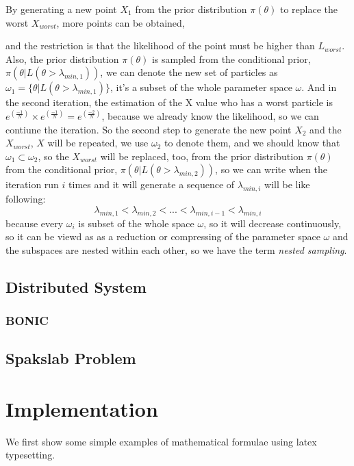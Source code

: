 \documentclass[11pt]{book}
\begin{document}
By generating a new point $X_1$ from 
the prior distribution $\pi(\theta)$ to replace the worst $X_{worst}$, more points can be obtained,

and the restriction is that the likelihood of the point must be higher than $L_{worst}$.
Also, the prior distribution $\pi(\theta)$ is sampled from the conditional prior, $\pi(\theta | L(\theta > \lambda_{min, 1}))$,
we can denote the new set of particles as $\omega_1=\{\theta|L(\theta> \lambda_{min, 1})\}$, it's a subset of the whole parameter space $\omega$.
And in the second iteration, the estimation of the X value who has a worst particle is $e^{(\frac{-1}{N})} \times e^{(\frac{-1}{N})} = e^{(\frac{-2}{N})}$,
because we already know the likelihood, so we can contiune the iteration.
So the second step to generate the new point $X_2$ and the $X_{worst}$, $X$ will be repeated, we use 
$\omega_2$ to denote them, and we should know that 
$\omega_1 \subset \omega_2$, so the $X_{worst}$ will be replaced, too, from 
the prior distribution $\pi(\theta)$ from the conditional prior, $\pi(\theta | L(\theta > \lambda_{min, 2}))$, so we can write 
when the iteration run $i$ times and it will generate a sequence of $\lambda _{min,i}$ will be like following:
\begin{equation*}
	\lambda _{min,1} < \lambda _{min,2} <  ... < \lambda _{min,i-1} < \lambda _{min,i}
\end{equation*}
because every $\omega_i$ is subset of the whole space $\omega$, so it will 
decrease continuously, so it can be viewd as as a reduction or compressing
 of the parameter space $\omega$ and the subspaces are nested within each other, 
so we have the term \textit{nested sampling}.


\section{Distributed System}
\subsection{BONIC}
\section{Spakslab Problem}

\chapter{Implementation}
We first show  some simple examples of 
mathematical formulae using latex typesetting.
\end{document}
